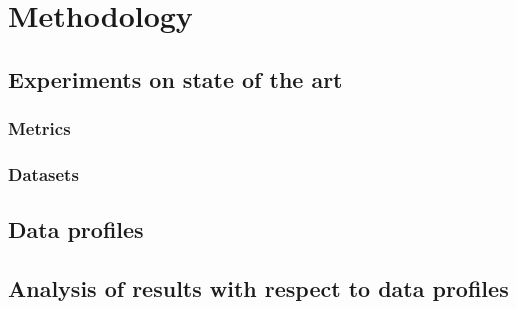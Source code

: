 \chapter{Methodology}
\section{Experiments on state of the art}



\subsection{Metrics}

\subsection{Datasets}


\section{Data profiles}


\section{Analysis of results with respect to data profiles}